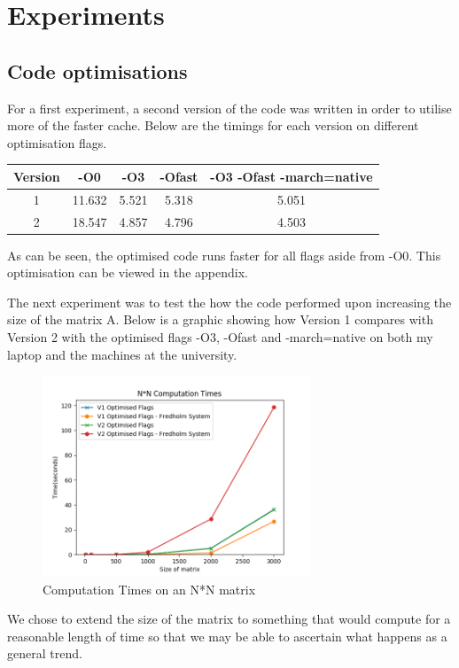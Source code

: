 \section{Experiments}
\subsection{Code optimisations}
For a first experiment, a second version of the code was written in order to utilise more of the faster cache. Below are the timings for each version on different optimisation flags.
\begin{center}
    \begin{tabular}{|c|c|c|c|c|}
        \hline
        Version & -O0 & -O3 & -Ofast & -O3 -Ofast -march=native\\
        \hline
        1 & 11.632 & 5.521 & 5.318 & 5.051\\
        \hline
        2 & 18.547 & 4.857 & 4.796 & 4.503\\
        \hline
    \end{tabular}
\end{center}
As can be seen, the optimised code runs faster for all flags aside from -O0. This optimisation can be viewed in the appendix.

The next experiment was to test the how the code performed upon increasing the size of the matrix A. Below is a graphic showing how Version 1 compares with Version 2 with the optimised flags -O3, -Ofast and -march=native on both my laptop and the machines at the university.

\begin{figure}[htb]
    \begin{center}
        \includegraphics[width=8cm]{../images/NN_comp_times.png}
        \caption{Computation Times on an N*N matrix}
    \end{center}
\end{figure}

We chose to extend the size of the matrix to something that would compute for a reasonable length of time so that we may be able to ascertain what happens as a general trend.

